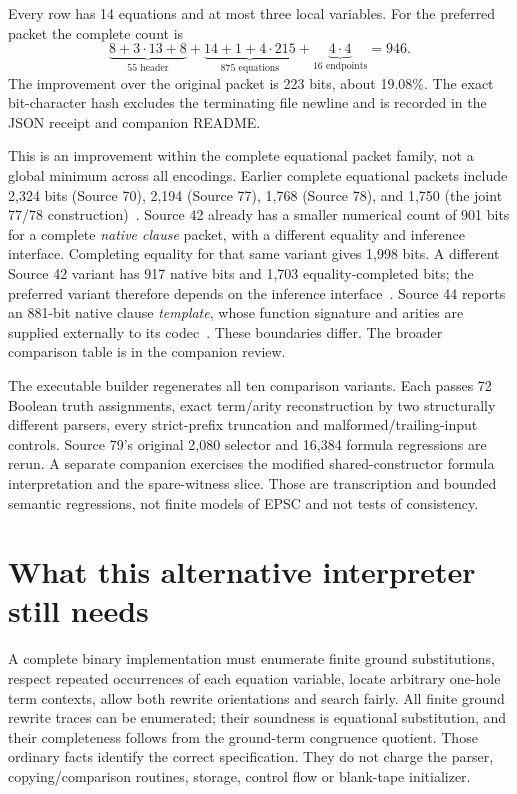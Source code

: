 \documentclass[11pt]{article}
\begin{document}
Every row has 14 equations and at most three local variables. For the
preferred packet the complete count is
\[
 \underbrace{8+3\cdot13+8}_{55\text{ header}}
 +\underbrace{14+1+4\cdot215}_{875\text{ equations}}
 +\underbrace{4\cdot4}_{16\text{ endpoints}}=946.
\]
The improvement over the original packet is 223 bits, about 19.08\%.
The exact bit-character hash excludes the terminating file newline and is
recorded in the JSON receipt and companion README.

This is an improvement within the complete equational packet family, not a
global minimum across all encodings. Earlier complete equational packets
include 2,324 bits (Source 70), 2,194 (Source 77), 1,768 (Source 78), and
1,750 (the joint 77/78 construction)~\cite{earlier}. Source 42 already has
a smaller numerical count of 901 bits for a complete \emph{native clause}
packet, with a different equality and inference interface. Completing
equality for that same variant gives 1,998 bits. A different Source 42
variant has 917 native bits and 1,703 equality-completed bits; the preferred
variant therefore depends on the inference interface~\cite{clause42}.
Source 44 reports
an 881-bit native clause \emph{template}, whose function signature and
arities are supplied externally to its codec~\cite{template44}. These
boundaries differ. The broader comparison table is in the companion review.

The executable builder regenerates all ten comparison variants. Each
passes 72 Boolean truth assignments, exact term/arity reconstruction by
two structurally different parsers, every strict-prefix truncation and
malformed/trailing-input controls. Source 79's original 2,080 selector and
16,384 formula regressions are rerun. A separate companion exercises the
modified shared-constructor formula interpretation and the spare-witness
slice. Those are transcription and bounded semantic regressions, not
finite models of EPSC and not tests of consistency.

\section{What this alternative interpreter still needs}

A complete binary implementation must enumerate finite ground substitutions,
respect repeated occurrences of each equation variable, locate arbitrary
one-hole term contexts, allow both rewrite orientations and search fairly.
All finite ground rewrite traces can be enumerated; their soundness is
equational substitution, and their completeness follows from the ground-term
congruence quotient. Those ordinary facts identify the correct specification.
They do not charge the parser, copying/comparison routines, storage, control
flow or blank-tape initializer.
\end{document}
